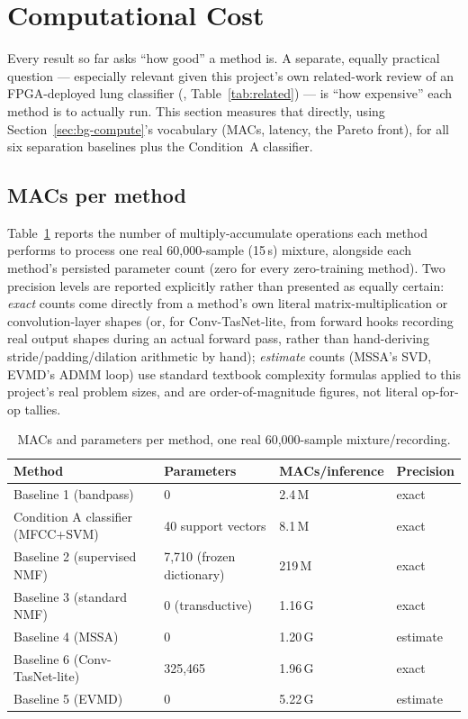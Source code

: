 \documentclass[11pt]{article}
\begin{document}
\section{Computational Cost}
\label{sec:compute}

Every result so far asks ``how good'' a method is. A separate, equally
practical question --- especially relevant given this project's own
related-work review of an FPGA-deployed lung classifier (\cite{edgelung},
Table~\ref{tab:related}) --- is ``how expensive'' each method is to
actually run. This section measures that directly, using
Section~\ref{sec:bg-compute}'s vocabulary (MACs, latency, the Pareto
front), for all six separation baselines plus the Condition~A classifier.

\subsection{MACs per method}
\label{sec:macs}

Table~\ref{tab:macs} reports the number of multiply-accumulate operations
each method performs to process one real 60{,}000-sample (15\,s) mixture,
alongside each method's persisted parameter count (zero for every
zero-training method). Two precision levels are reported explicitly rather
than presented as equally certain: \emph{exact} counts come directly from
a method's own literal matrix-multiplication or convolution-layer shapes
(or, for Conv-TasNet-lite, from forward hooks recording real output shapes
during an actual forward pass, rather than hand-deriving stride/padding/dilation
arithmetic by hand); \emph{estimate} counts (MSSA's SVD, EVMD's ADMM loop)
use standard textbook complexity formulas applied to this project's real
problem sizes, and are order-of-magnitude figures, not literal
op-for-op tallies.

\begin{table}[H]
\centering
\caption{MACs and parameters per method, one real 60,000-sample mixture/recording.}
\label{tab:macs}
\begin{tabular}{@{}llll@{}}
\toprule
Method & Parameters & MACs/inference & Precision \\
\midrule
Baseline 1 (bandpass) & 0 & 2.4\,M & exact \\
Condition A classifier (MFCC+SVM) & 40 support vectors & 8.1\,M & exact \\
Baseline 2 (supervised NMF) & 7{,}710 (frozen dictionary) & 219\,M & exact \\
Baseline 3 (standard NMF) & 0 (transductive) & 1.16\,G & exact \\
Baseline 4 (MSSA) & 0 & 1.20\,G & estimate \\
Baseline 6 (Conv-TasNet-lite) & 325{,}465 & 1.96\,G & exact \\
Baseline 5 (EVMD) & 0 & 5.22\,G & estimate \\
\bottomrule
\end{tabular}
\end{table}
\end{document}
